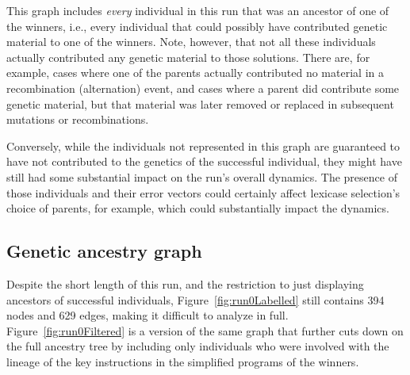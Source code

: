 This graph includes \emph{every} individual in this run that was an 
ancestor of one of the winners, i.e., every individual that could possibly have 
contributed genetic material to one of the winners. Note, however, that not
all these individuals actually contributed any genetic material to those
solutions. There are, for example, cases where one of the parents actually
contributed no material in a recombination (alternation) event, and cases where
a parent did contribute some genetic material, but that material was later
removed or replaced in subsequent mutations or recombinations. 

Conversely, while the individuals not represented in this graph are
guaranteed to have not contributed to the genetics of the successful
individual, they might have still had some substantial impact on the
run's overall dynamics. The presence of those individuals and their
error vectors could certainly affect lexicase selection's choice of parents,
for example, which could substantially impact the dynamics.

\subsection{Genetic ancestry graph}

Despite the short length of this run, and the restriction to just displaying
ancestors of successful individuals, Figure~\ref{fig:run0Labelled} still
contains 394 nodes and 629 edges, making it difficult to analyze in full.
Figure~\ref{fig:run0Filtered} is a version of the same graph that further
cuts down on the full ancestry tree by including only individuals who were
involved with the lineage of the key instructions in the simplified programs of the
winners.

